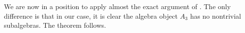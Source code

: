 We are now in a position to apply almost the exact argument of \cite{cain_noah}.
The only difference is that in our case, it is clear the algebra object $A_3$ has no nontrivial subalgebras.
The theorem follows.

\begin{comment}
\begin{proof}[Proof of Theorem~\ref{thm:level-3}]
    We now note that since $\GG_2(q)$ and $\DD_3$ are unitary, we know that $\GG_2(q) \hookrightarrow \DD_3$ induces a $\dagger$-embedding $\ol{\GG_2(q)} \hookrightarrow \ol{\DD_3}$. Thus, there is a chain
    \[
        \ol{\GG_2(q_3)} \hookrightarrow \ol{\DD_3} \xhookrightarrow{\ol{\Psi_3}} \ol{\Rep(U_{q_3}(\gg_2))}_{A_3}
    \] 
    of faithful dominant functors. Using the universal property of Karoubi completion, we arrive at the commutative diagram
    \[
        \xymatrix@R=40pt@C=65pt{
        \ol{\GG_2(q_3)} \ar@{^{(}->}[r] \ar@{^{(}->}[d] & \ol{\DD_3} \ar@{^{(}->}[dr]^{\ol{\Psi}} \ar@{^{(}->}[d] & \\
        \ol{\Rep(U_{q_3}(\gg_2))} \ar[r]^{\FF_1} & \Ab(\ol{\DD_3}) \ar[r]^{\FF_2} & \ol{\Rep(U_{q_3}(\gg_2))}_{A_3} \\
        }
    \]
    where $\FF_1$ and $\FF_2$ are the induced functors. At this point we shift our focus to the lower layer of the diagram.
    
    By \cite{},  $(\FF_2 \circ \FF_1)|_{\ol{\GG_2(q_3)}} = \FF_{A_3}|_{\ol{\GG_2(q_3)}}$ implies $\FF_2 \circ \FF_1 = \FF_{A_3}$. 
    Note that both $\ol{\Rep(U_{q_3}(\gg_2))}$ and $\Ab(\ol{\DD_3})$ are semisimple, and therefore $\FF_1$ has a lax-monoidal right adjoint $\FF_1^\vee$. 
    Proposition~\ref{prop:exact-functor} now allows us to conjure $K$ and $B$ such that the following diagram commutes up to natural isomorphism:
    \[
        \xymatrix@R=40pt@C=65pt{
        \ol{\Rep(U_{q_3}(\gg_2))} \ar[r]^{\FF_1} \ar[dr]_{\FF_B} & \Ab(\ol{\DD_3}) \ar[r]^{\FF_2} \ar[d]^{K} & \ol{\Rep(U_q(\gg_2))}_A \\
        & \ol{\Rep(U_q(\gg_2))}_B \ar[ur]_{\FF'} & \\
        }
    \]
    Here, $\FF'$ is defined to complete the diagram. From here, apply $\FF_B^\vee$ to the containment $\unit \subseteq \FF'^\vee(\unit)$:
    \begin{align*}
        B & = \FF_B^\vee(\unit) \subseteq \FF_B^\vee \circ \FF'^\vee(\unit) \\
        & \cong (\FF_2 \circ \FF_1)^\vee (\unit) \\
        & = \FF_{A_3}^\vee(\unit) \\
        & = \FF_A^\vee(A_3) = A_3.
    \end{align*}
    
    So $B\subseteq A_3$. Since $A_3$ has only two simple summands, we know $A_3$ has no nontrivial subalgebras: $B\cong \unit$ or $B\cong A_3$.
    If $B\cong \unit$ then
    \[
        \Ab(\ol{\DD_3}) \cong \ol{\Rep(U_{q_3}(\gg_2))}_\unit \cong \ol{\Rep(U_{q_3}(\gg_2))}
    \]
    A quick dimension count falsifies this. Hence $\Ab(\ol{\DD_3}) \cong \ol{ \Rep(U_{q_3}(\gg_2))}_{A_3}$.
\end{proof}

\end{comment}
